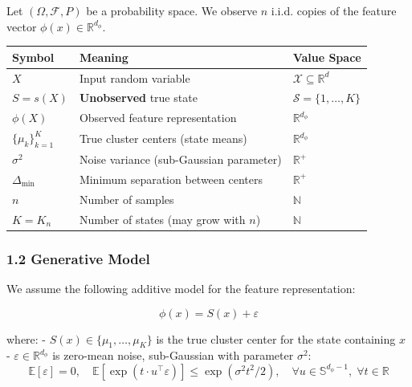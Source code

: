 \documentclass[
  12pt,
]{article}
\begin{document}
Let \((\Omega, \mathcal{F}, P)\) be a probability space. We observe
\(n\) i.i.d. copies of the feature vector
\(\phi(x) \in \mathbb{R}^{d_\phi}\).

\begin{longtable}[]{@{}
  >{\raggedright\arraybackslash}p{}
  >{\raggedright\arraybackslash}p{}
  >{\raggedright\arraybackslash}p{}@{}}
\toprule\noalign{}
\begin{minipage}[b]{\linewidth}\raggedright
Symbol
\end{minipage} & \begin{minipage}[b]{\linewidth}\raggedright
Meaning
\end{minipage} & \begin{minipage}[b]{\linewidth}\raggedright
Value Space
\end{minipage} \\
\midrule\noalign{}
\endhead
\bottomrule\noalign{}
\endlastfoot
\(X\) & Input random variable &
\(\mathcal{X} \subseteq \mathbb{R}^d\) \\
\(S = s(X)\) & \textbf{Unobserved} true state &
\(\mathcal{S} = \{1, \dots, K\}\) \\
\(\phi(X)\) & Observed feature representation &
\(\mathbb{R}^{d_\phi}\) \\
\(\{\mu_k\}_{k=1}^K\) & True cluster centers (state means) &
\(\mathbb{R}^{d_\phi}\) \\
\(\sigma^2\) & Noise variance (sub-Gaussian parameter) &
\(\mathbb{R}^+\) \\
\(\Delta_{\min}\) & Minimum separation between centers &
\(\mathbb{R}^+\) \\
\(n\) & Number of samples & \(\mathbb{N}\) \\
\(K = K_n\) & Number of states (may grow with \(n\)) & \(\mathbb{N}\) \\
\end{longtable}

\subsubsection{1.2 Generative Model}\label{generative-model}

We assume the following additive model for the feature representation:

\[\phi(x) = S(x) + \varepsilon\]

where: - \(S(x) \in \{\mu_1, \dots, \mu_K\}\) is the true cluster center
for the state containing \(x\) - \(\varepsilon \in \mathbb{R}^{d_\phi}\)
is zero-mean noise, sub-Gaussian with parameter \(\sigma^2\):
\[\mathbb{E}[\varepsilon] = 0, \quad \mathbb{E}[\exp(t \cdot u^\top \varepsilon)] \leq \exp(\sigma^2 t^2 / 2), \quad \forall u \in \mathbb{S}^{d_\phi-1}, \; \forall t \in \mathbb{R}\]
\end{document}
